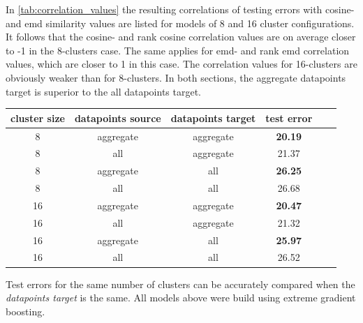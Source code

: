 \documentclass{ws-ijait}
\begin{document}
	In \cref{tab:correlation_values} the resulting correlations of testing errors with cosine- and emd similarity values are listed for models of 8 and 16 cluster configurations. It follows that the cosine- and rank cosine correlation values are on average closer to -1 in the 8-clusters case. The same applies for emd- and rank emd correlation values, which are closer to 1 in this case. The correlation values for 16-clusters are obviously weaker than for 8-clusters. In both sections, the aggregate datapoints target is superior to the all datapoints target.
	
	\begin{table}[!ht]
		{\begin{tabular}{ | c | c | c | c | c | c | }
				\hline
				{cluster size} & {datapoints source} & {datapoints target} & {test error} \\ \hline
				8	&	aggregate 	&	aggregate 	& 	\textbf{20.19} 	\\ \hline
				8	&	all 		&	aggregate 	& 	21.37	\\ \hline \hline
				8	&	aggregate 	&	all 		& 	\textbf{26.25}	\\ \hline
				8	&	all			& 	all 		&	26.68	\\ \hline \hline
				16	&	aggregate	& 	aggregate 	&	\textbf{20.47}	\\ \hline
				16	&	all			& 	aggregate 	& 	21.32	\\ \hline \hline
				16	&	aggregate	& 	all 		& 	\textbf{25.97}	\\ \hline
				16	&	all			&	all 		&	26.52	\\ \hline \hline
		\end{tabular}}
		\label{tab:train_test_errors}
		\begin{tabnote}
			Test errors for the same number of clusters can be accurately compared when the \textit{datapoints target} is the same. All models above were build using extreme gradient boosting.
		\end{tabnote}
	\end{table}
		
\end{document}
